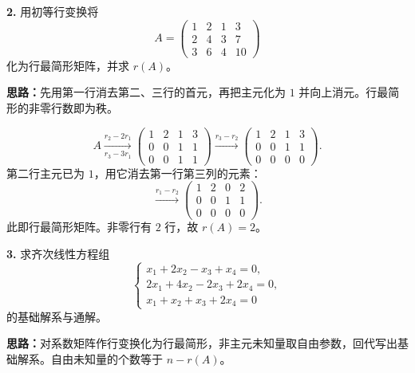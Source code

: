 \textbf{2.} 用初等行变换将
\[
A=\begin{pmatrix}1&2&1&3\\2&4&3&7\\3&6&4&10\end{pmatrix}
\]
化为行最简形矩阵，并求 \(r(A)\)。

\ifshowsolutions%
\textbf{思路：}先用第一行消去第二、三行的首元，再把主元化为 \(1\) 并向上消元。行最简形的非零行数即为秩。

\[
A\xrightarrow[r_3-3r_1]{r_2-2r_1}
\begin{pmatrix}1&2&1&3\\0&0&1&1\\0&0&1&1\end{pmatrix}
\xrightarrow{r_3-r_2}
\begin{pmatrix}1&2&1&3\\0&0&1&1\\0&0&0&0\end{pmatrix}.
\]
第二行主元已为 \(1\)，用它消去第一行第三列的元素：
\[
\xrightarrow{r_1-r_2}
\begin{pmatrix}1&2&0&2\\0&0&1&1\\0&0&0&0\end{pmatrix}.
\]
此即行最简形矩阵。非零行有 \(2\) 行，故 \(r(A)=2\)。

\else \answerarea[8] \fi%

\textbf{3.} 求齐次线性方程组
\[
\begin{cases}
x_1+2x_2-x_3+x_4=0,\\
2x_1+4x_2-2x_3+2x_4=0,\\
x_1+x_2+x_3+2x_4=0
\end{cases}
\]
的基础解系与通解。

\ifshowsolutions%
\textbf{思路：}对系数矩阵作行变换化为行最简形，非主元未知量取自由参数，回代写出基础解系。自由未知量的个数等于 \(n-r(A)\)。

